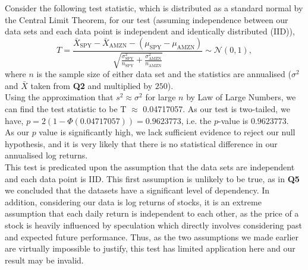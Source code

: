 \documentclass[twocolumn]{article}
\begin{document}
Consider the following test statistic, which is distributed as a standard normal by the Central Limit Theorem, for our test (assuming independence between our data sets and each data point is independent and identically distributed (IID)),
$$T = \frac{ \bar{X}_{\text{SPY}} - \bar{X}_{\text{AMZN}} - \left(\mu_{\text{SPY}} - \mu_{\text{AMZN}}\right)}{\sqrt{\frac{\sigma_{\text{SPY}}^2}{n_\text{SPY}}+\frac{\sigma_\text{AMZN}^2}{n_\text{AMZN}}}} \sim\mathcal{N} (0,1),$$
where $n$ is the sample size of either data set and the statistics are annualised ($\sigma^2$ and $\bar{X}$ taken from \textbf{Q2} and multiplied by $250$). \\

Using the approximation that $s^2 \approx \sigma^2$ for large $n$ by Law of Large Numbers, we can find the test statistic to be T $\approx$ 0.04717057. As our test is two-tailed, we have, $p = 2(1-\Phi(0.04717057)) = 0.9623773$, i.e. the $p$-value is $0.9623773.$ \\

As our $p$ value is significantly high, we lack sufficient evidence to reject our null hypothesis, and it is very likely that there is no statistical difference in our annualised log returns. \\

This test is predicated upon the assumption that the data sets are independent and each data point is IID. This first assumption is unlikely to be true, as in \textbf{Q5} we concluded that the datasets have a significant level of dependency. In addition, considering our data is log returns of stocks, it is an extreme assumption that each daily return is independent to each other, as the price of a stock is heavily influenced by speculation which directly involves considering past and expected future performance. Thus, as the two assumptions we made earlier are virtually impossible to justify, this test has limited application here and our result may be invalid.

    
\end{document}
